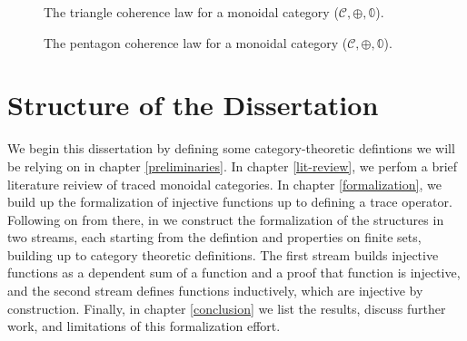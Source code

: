\begin{figure}[h]
  \centering
  \caption{The triangle coherence law for a monoidal category (\(\mathcal{C}, \oplus, 𝟘\)).} \cite{awodey2010-category-theory-book,egbert1998-coherence-theorem}
  \label{fig:monoidal-triangle}
\end{figure}

\begin{figure}[h]
  \centering
  \caption{The pentagon coherence law for a monoidal category (\(\mathcal{C}, \oplus, 𝟘\)). \cite{awodey2010-category-theory-book,egbert1998-coherence-theorem}}
  \label{fig:monoidal-pentagon}
\end{figure}

\section{Structure of the Dissertation}

We begin this dissertation by defining some category-theoretic
defintions we will be relying on in chapter \ref{preliminaries}. In chapter \ref{lit-review},
we perfom a brief literature reiview of traced monoidal categories. In
chapter \ref{formalization}, we build up the formalization of
injective functions up to defining a trace operator. 
Following on from there, in  we construct the formalization of the
structures in two streams, each starting from the defintion and
properties on finite sets, building up to category theoretic
definitions. The first stream builds injective functions as a
dependent sum of a function and a proof that function is injective,
and the second stream defines functions inductively, which are
injective by construction. Finally, in chapter \ref{conclusion} we
list the results, discuss further work, and limitations of this
formalization effort.

